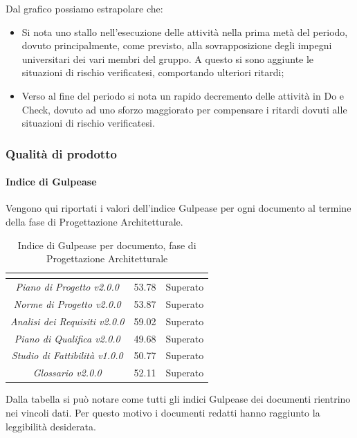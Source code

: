 Dal grafico possiamo estrapolare che:
\begin{itemize}
	\item Si nota uno stallo nell'esecuzione delle attività nella prima metà del periodo, dovuto principalmente, come previsto, alla sovrapposizione degli impegni universitari dei vari membri del gruppo. A questo si sono aggiunte le situazioni di rischio verificatesi, comportando ulteriori ritardi;
	\item Verso al fine del periodo si nota un rapido decremento delle attività in Do e Check, dovuto ad uno sforzo maggiorato per compensare i ritardi dovuti alle situazioni di rischio verificatesi.
\end{itemize}
\subsubsection{Qualità di prodotto}
\paragraph{Indice di Gulpease} \Spazio
Vengono qui riportati i valori dell'indice Gulpease per ogni documento al termine della fase di Progettazione Architetturale.
\renewcommand{\arraystretch}{1.5}
\begin{table}[H]
	\begin{center}
		\begin{tabular}{|c|c|c|}
			\hline
			\rowcolor{title_row}
			\textbf{\color{title_text}{Documento}} & \textbf{\color{title_text}{Valore indice}} & \textbf{\color{title_text}{Esito}} \\
			\hline
			\emph{Piano di Progetto v2.0.0} & {53.78} & {Superato}\\
			\hline
			\emph{Norme di Progetto v2.0.0} & {53.87} & {Superato}\\
			\hline
			\emph{Analisi dei Requisiti v2.0.0} & {59.02} & {Superato}\\
			\hline
			\emph{Piano di Qualifica v2.0.0} & {49.68} & {Superato}\\
			\hline
			\emph{Studio di Fattibilità v1.0.0} & {50.77} & {Superato}\\
			\hline
			\emph{Glossario v2.0.0} & {52.11} & {Superato}\\
			\hline
		\end{tabular}
		\caption[Esiti verifica documenti, Consolidamento e Progettazione Architetturale]{Indice di Gulpease per documento, fase di Progettazione Architetturale}
		\label{tabella:verifica documenti rp}
	\end{center}
\end{table}
\renewcommand{\arraystretch}{1}
Dalla tabella si può notare come tutti gli indici Gulpease dei documenti rientrino nei vincoli dati. Per questo motivo i documenti redatti hanno raggiunto la leggibilità desiderata.


